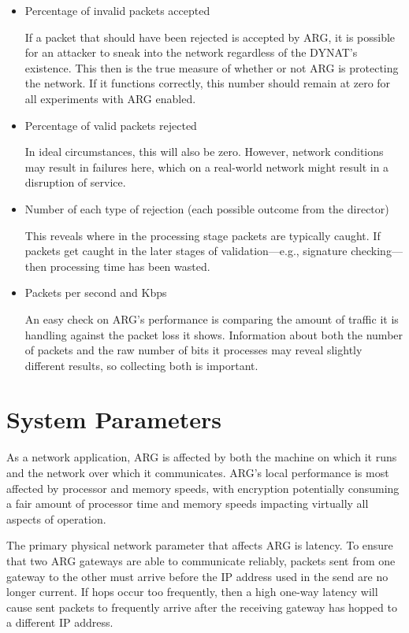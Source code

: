 \begin{itemize}
\item Percentage of invalid packets accepted
	\par If a packet that should have been rejected is accepted by \ac{ARG}, it is possible for an attacker to sneak into the network regardless of the \ac{DYNAT}'s existence. This then is the true measure of whether or not \ac{ARG} is protecting the network. If it functions correctly, this number should remain at zero for all experiments with \ac{ARG} enabled.

\item Percentage of valid packets rejected
	\par In ideal circumstances, this will also be zero. However, network conditions may result in failures here, which on a real-world network might result in a disruption of service. 

\item Number of each type of rejection (each possible outcome from the director)
	\par This reveals where in the processing stage packets are typically caught. If packets get caught in the later stages of validation---e.g., signature checking---then processing time has been wasted.

\item Packets per second and \acf{Kbps}
	\par An easy check on \ac{ARG}'s performance is comparing the amount of traffic it is handling against the packet loss it shows. Information about both the number of packets and the raw number of bits it processes may reveal slightly different results, so collecting both is important.
\end{itemize}

\section{System Parameters}
\label{sec:parameters}
\par As a network application, \ac{ARG} is affected by both the machine on which it runs and the network over which it communicates. \ac{ARG}'s local performance is most affected by processor and memory speeds, with encryption potentially consuming a fair amount of processor time and memory speeds impacting virtually all aspects of operation.

\par The primary physical network parameter that affects \ac{ARG} is latency. To ensure that two \ac{ARG} gateways are able to communicate reliably, packets sent from one gateway to the other must arrive before the \ac{IP} address used in the send are no longer current. If hops occur too frequently, then a high one-way latency will cause sent packets to frequently arrive after the receiving gateway has hopped to a different \ac{IP} address. 

